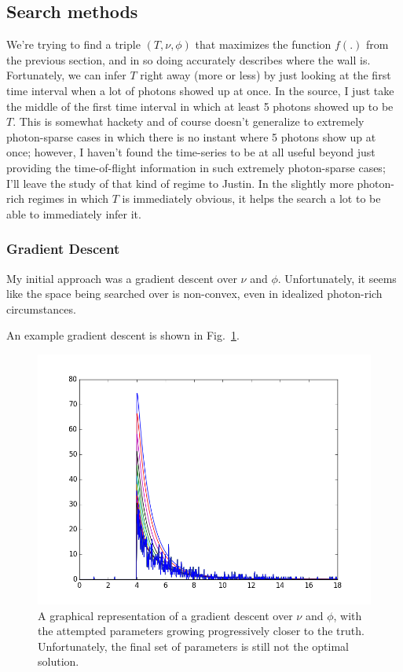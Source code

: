 \documentclass[11pt]{article}
\begin{document}
\subsection{Search methods}

We're trying to find a triple $(T, \nu, \phi)$ that maximizes the function $f(.)$ from the previous section, and in so doing accurately describes where the wall is. Fortunately, we can infer $T$ right away (more or less) by just looking at the first time interval when a lot of photons showed up at once. In the source, I just take the middle of the first time interval in which at least 5 photons showed up to be $T$. This is somewhat hackety and of course doesn't generalize to extremely photon-sparse cases in which there is no instant where 5 photons show up at once; however, I haven't found the time-series to be at all useful beyond just providing the time-of-flight information in such extremely photon-sparse cases; I'll leave the study of that kind of regime to Justin. In the slightly more photon-rich regimes in which $T$ is immediately obvious, it helps the search a lot to be able to immediately infer it.

\subsubsection{Gradient Descent} 

My initial approach was a gradient descent over $\nu$ and $\phi$. Unfortunately, it seems like the space being searched over is non-convex, even in idealized photon-rich circumstances. 

An example gradient descent is shown in Fig.~\ref{fig:gradientdescent}.

\begin{figure}
\begin{center}
\centering
\includegraphics[scale=0.5]{figs/gradientdescent.png} %
\caption{A graphical representation of a gradient descent over $\nu$ and $\phi$, with the attempted parameters growing progressively closer to the truth. Unfortunately, the final set of parameters is still not the optimal solution. \label{fig:gradientdescent}}
\end{center}
\end{figure}
\end{document}
